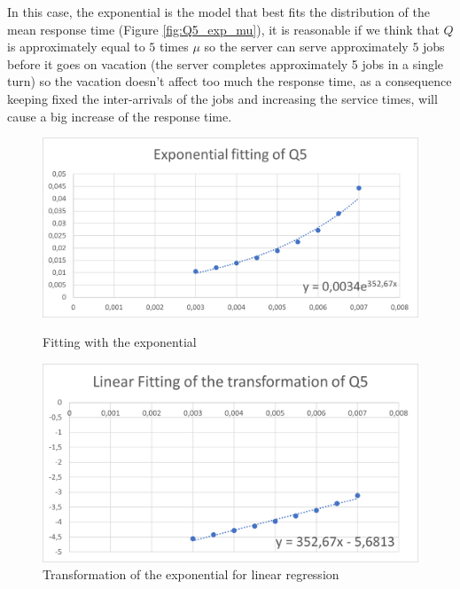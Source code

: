 \documentclass{article}
\begin{document}
                     In this case, the exponential is the model that best fits the distribution of the mean response time (Figure \ref{fig:Q5_exp_mu}), it is reasonable if we think that $Q$ is approximately equal to $5$ times $\mu$ so the server can serve approximately $5$ jobs before it goes on vacation (the server completes approximately 5 jobs in a single turn) so the vacation doesn't affect too much the response time, as a consequence keeping fixed the inter-arrivals of the jobs and increasing the service times, will cause a big increase of the response time.
                    
                    \begin{figure}[htbp!]
                        \centering
                        \begin{minipage}[c]{.40\textwidth}
                            \centering
                            \includegraphics[width=\textwidth]{./data_analysis/Q5_exp_mu.png}
                            \caption{Fitting with the exponential}
                            \label{fig:Q5_exp_mu}
                        \end{minipage}
                        \hspace{10mm}
                        \begin{minipage}[c]{.40\textwidth}
                            \centering
                            \includegraphics[width=\textwidth]{./data_analysis/Q5_lin_mu.png}
                            \caption{Transformation of the exponential for linear regression}
                            \label{fig:Q5_lin_mu}
                        \end{minipage}
                    \end{figure} 
                    
\end{document}
